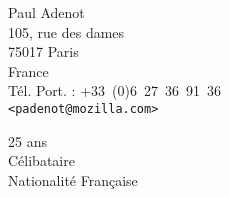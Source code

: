 


\pagestyle{empty}

\begin{minipage}{0.4\textwidth}
\raggedright
{
        Paul Adenot\\
        105, rue des dames\\
        75017 Paris\\
        France\\
        Tél. Port. : +33~(0)6~27~36~91~36\\
        {\tt <padenot@mozilla.com>}\\
}
\end{minipage}
\begin{minipage}{0.5\textwidth}
\raggedleft
{
25 ans\\
Célibataire\\
Nationalité Française\\
}
\end{minipage}

\vfill


\vfill

